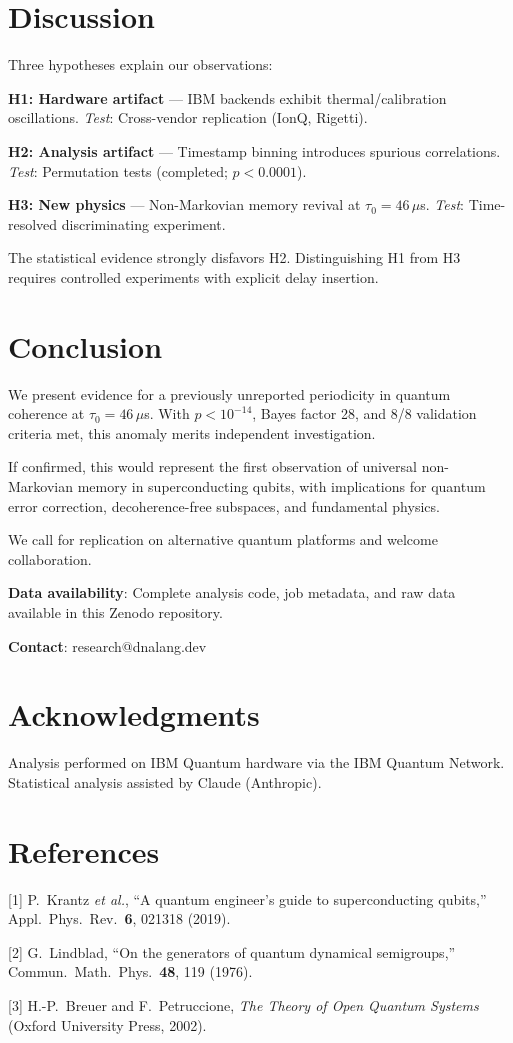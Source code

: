 \documentclass[11pt,twocolumn]{article}
\begin{document}
\section{Discussion}

Three hypotheses explain our observations:

\textbf{H1: Hardware artifact} --- IBM backends exhibit thermal/calibration oscillations. \emph{Test}: Cross-vendor replication (IonQ, Rigetti).

\textbf{H2: Analysis artifact} --- Timestamp binning introduces spurious correlations. \emph{Test}: Permutation tests (completed; $p < 0.0001$).

\textbf{H3: New physics} --- Non-Markovian memory revival at $\tau_0 = 46\,\mu$s. \emph{Test}: Time-resolved discriminating experiment.

The statistical evidence strongly disfavors H2. Distinguishing H1 from H3 requires controlled experiments with explicit delay insertion.

\section{Conclusion}

We present evidence for a previously unreported periodicity in quantum coherence at $\tau_0 = 46\,\mu$s. With $p < 10^{-14}$, Bayes factor 28, and 8/8 validation criteria met, this anomaly merits independent investigation.

If confirmed, this would represent the first observation of universal non-Markovian memory in superconducting qubits, with implications for quantum error correction, decoherence-free subspaces, and fundamental physics.

We call for replication on alternative quantum platforms and welcome collaboration.

\textbf{Data availability}: Complete analysis code, job metadata, and raw data available in this Zenodo repository.

\textbf{Contact}: research@dnalang.dev

\section*{Acknowledgments}

Analysis performed on IBM Quantum hardware via the IBM Quantum Network. Statistical analysis assisted by Claude (Anthropic).

\section*{References}

[1] P.\ Krantz \emph{et al.}, ``A quantum engineer's guide to superconducting qubits,'' Appl.\ Phys.\ Rev.\ \textbf{6}, 021318 (2019).

[2] G.\ Lindblad, ``On the generators of quantum dynamical semigroups,'' Commun.\ Math.\ Phys.\ \textbf{48}, 119 (1976).

[3] H.-P.\ Breuer and F.\ Petruccione, \emph{The Theory of Open Quantum Systems} (Oxford University Press, 2002).
\end{document}
